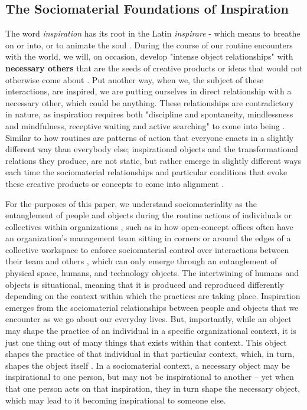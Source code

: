\subsection{The Sociomaterial Foundations of Inspiration}
    The word \textit{inspiration} has its root in the Latin \textit{inspirare} - which means to breathe on or into, or to animate the soul \cite{hymer1990inspiration}. During the course of our routine encounters with the world, we will, on occasion, develop "intense object relationships" with \textbf{necessary others} that are the seeds of creative products or ideas that would not otherwise come about \cite{hymer1990inspiration}. Put another way, when we, the subject of these interactions, are inspired, we are putting ourselves in direct relationship with a necessary other, which could be anything. These relationships are contradictory in nature, as inspiration requires both "discipline and spontaneity, mindlessness and mindfulness, receptive waiting and active searching" to come into being \cite{hymer1990inspiration}. Similar to how routines are patterns of action that everyone enacts in a slightly different way than everybody else; inspirational objects and the transformational relations they produce, are not static, but rather emerge in slightly different ways each time the sociomaterial relationships and particular conditions that evoke these creative products or concepts to come into alignment \cite{feldman2000organizational, pentland2012dynamics, rudnicki2021ideas, hymer1990inspiration}.\par

    For the purposes of this paper, we understand sociomateriality as the entanglement of people and objects during the routine actions of individuals or collectives within organizations \cite{orlikowski2007sociomaterial, cook1999bridging}, such as in how open-concept offices often have an organization's management team sitting in corners or around the edges of a collective workspace to enforce sociomaterial control over interactions between their team and others \cite{perriton2023constitutive}, which can only emerge through an entanglement of physical space, humans, and technology objects. The intertwining of humans and objects is situational, meaning that it is produced and reproduced differently depending on the context within which the practices are taking place. Inspiration emerges from the sociomaterial relationships between people and objects that we encounter as we go about our everyday lives. But, importantly, while an object may shape the practice of an individual in a specific organizational context, it is just one thing out of many things that exists within that context. This object shapes the practice of that individual in that particular context, which, in turn, shapes the object itself \cite{oraghallaigh2017sociomateriality}. In a sociomaterial context, a necessary object may be inspirational to one person, but may not be inspirational to another -- yet when that one person acts on that inspiration, they in turn shape the necessary object, which may lead to it becoming inspirational to someone else. \par

